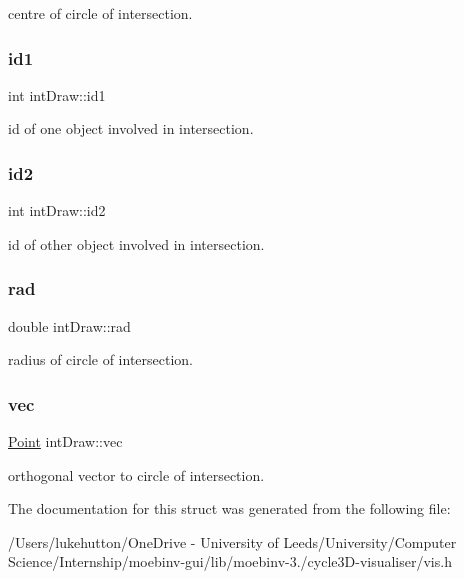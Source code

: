 centre of circle of intersection. \mbox{\label{structint_draw_a96bf5f7cd19d3a83bd5a53f2fa0aeb71}} 
\subsubsection{\texorpdfstring{id1}{id1}}
{\footnotesize\ttfamily int int\+Draw\+::id1}

id of one object involved in intersection. \mbox{\label{structint_draw_a25ba59d3175591863f4e240e4fe6bd13}} 
\subsubsection{\texorpdfstring{id2}{id2}}
{\footnotesize\ttfamily int int\+Draw\+::id2}

id of other object involved in intersection. \mbox{\label{structint_draw_a9614ba917e8a2c0f7b782b72d12ba67b}} 
\subsubsection{\texorpdfstring{rad}{rad}}
{\footnotesize\ttfamily double int\+Draw\+::rad}

radius of circle of intersection. \mbox{\label{structint_draw_a527717b140f7983792ea0baeb1a3f234}} 
\subsubsection{\texorpdfstring{vec}{vec}}
{\footnotesize\ttfamily \mbox{\hyperlink{struct_point}{Point}} int\+Draw\+::vec}

orthogonal vector to circle of intersection. 

The documentation for this struct was generated from the following file\+:\begin{DoxyCompactItemize}
\item 
/\+Users/lukehutton/\+One\+Drive -\/ University of Leeds/\+University/\+Computer Science/\+Internship/moebinv-\/gui/lib/moebinv-\/3./cycle3\+D-\/visualiser/vis.\+h\end{DoxyCompactItemize}
